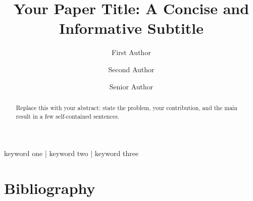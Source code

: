 \documentclass[twocolumn]{preprint}
\begin{document}
\title{Your Paper Title: A Concise and Informative Subtitle}

\author[1,\cofirst]{First Author}
\author[2]{Second Author}
\author[1,\corr]{Senior Author}
\date{}

\maketitle

\begin{abstract}
Replace this with your abstract: state the problem, your contribution, and the
main result in a few self-contained sentences.
\lipsum[1]
\end{abstract}

\begin{keywords}
keyword one | keyword two | keyword three
\end{keywords}





\clearpage
\section*{Bibliography}


\clearpage




\end{document}
